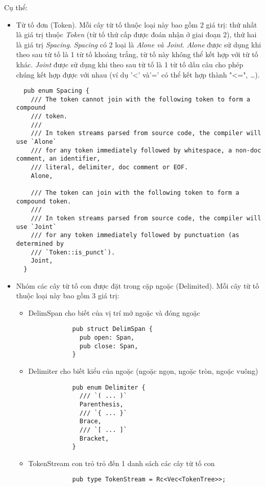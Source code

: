 Cụ thể:
\begin{itemize}
  \item Từ tố đơn (Token). Mỗi cây từ tố thuộc loại này bao gồm 2 giá trị: thứ nhất là giá trị thuộc \textit{Token} (từ tố thứ cấp được đoán nhận ở giai đoạn 2), thứ hai là giá trị \textit{Spacing}. \textit{Spacing} có 2 loại là \textit{Alone \emph{và} Joint}. \textit{Alone} được sử dụng khi theo sau từ tố là 1 từ tố khoảng trắng, từ tố này không thể kết hợp với từ tố khác. \textit{Joint} được sử dụng khi theo sau từ tố là 1 từ tố dấu câu cho phép chúng kết hợp đựợc với nhau (ví dụ '<' và'=' có thể kết hợp thành "<=", \dots).
  \begin{lstlisting}
  pub enum Spacing {
    /// The token cannot join with the following token to form a compound
    /// token.
    ///
    /// In token streams parsed from source code, the compiler will use `Alone`
    /// for any token immediately followed by whitespace, a non-doc comment, an identifier,
    /// literal, delimiter, doc comment or EOF.
    Alone,

    /// The token can join with the following token to form a compound token.
    ///
    /// In token streams parsed from source code, the compiler will use `Joint`
    /// for any token immediately followed by punctuation (as determined by
    /// `Token::is_punct`).
    Joint,
  }
  \end{lstlisting}
  \item Nhóm các cây từ tố con được đặt trong cặp ngoặc (Delimited). Mỗi cây từ tố thuộc loại này bao gồm 3 giá trị:
  \begin{itemize}
    \item DelimSpan cho biết của vị trí mở ngoặc và đóng ngoặc
          \begin{lstlisting}
            pub struct DelimSpan {
              pub open: Span,
              pub close: Span,
            }
          \end{lstlisting}
    \item Delimiter cho biết kiểu của ngoặc (ngoặc ngọn, ngoặc tròn, ngoặc vuông)
          \begin{lstlisting}
            pub enum Delimiter {
              /// `( ... )`
              Parenthesis,
              /// `{ ... }`
              Brace,
              /// `[ ... ]`
              Bracket,
            }
          \end{lstlisting}
    \item TokenStream con trỏ trỏ đến 1 danh sách các cây từ tố con
          \begin{lstlisting}
            pub type TokenStream = Rc<Vec<TokenTree>>;
          \end{lstlisting}
  \end{itemize}
\end{itemize}

